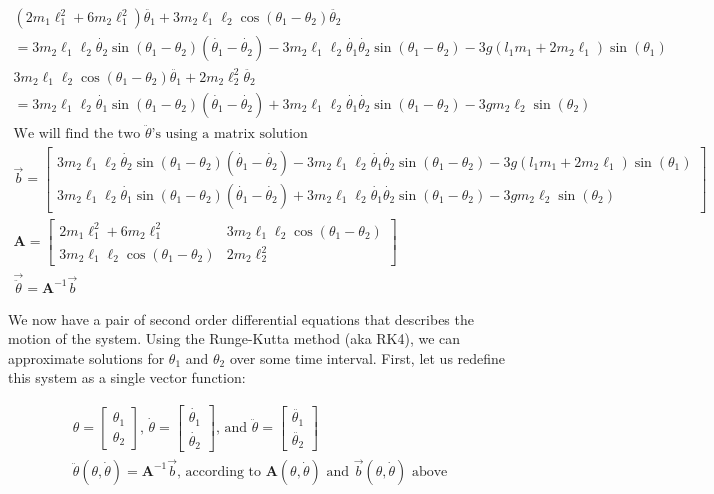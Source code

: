 \documentclass[]{article}
\begin{document}
\begin{gather*}
	(2m_1\ell_1^2 + 6m_2\ell_1^2)\ddot{\theta_1} + 3m_2\ell_1\ell_2\cos(\theta_1 - \theta_2)\ddot{\theta_2} \\
	= 3 m_2\ell_1\ell_2\dot{\theta_2}\sin(\theta_1 - \theta_2)(\dot{\theta_1} - \dot{\theta_2}) - 3m_2\ell_1\ell_2\dot{\theta_1}\dot{\theta_2}\sin(\theta_1 - \theta_2) - 3g(l_1m_1 + 2m_2\ell_1)\sin(\theta_1) \\
	3m_2\ell_1\ell_2\cos(\theta_1 - \theta_2)\ddot{\theta_1} + 2m_2\ell_2^2\ddot{\theta_2} \\ 
	= 3m_2\ell_1\ell_2\dot{\theta_1}\sin(\theta_1 - \theta_2)(\dot{\theta_1} - \dot{\theta_2}) + 3m_2\ell_1\ell_2\dot{\theta_1}\dot{\theta_2}\sin(\theta_1 - \theta_2) - 3g m_2\ell_2\sin(\theta_2) \\
	\text{We will find the two $\ddot{\theta}$'s using a matrix solution} \\
	\vec{b} = \begin{bmatrix}
		3 m_2\ell_1\ell_2\dot{\theta_2}\sin(\theta_1 - \theta_2)(\dot{\theta_1} - \dot{\theta_2}) - 3m_2\ell_1\ell_2\dot{\theta_1}\dot{\theta_2}\sin(\theta_1 - \theta_2) - 3g(l_1m_1 + 2m_2\ell_1)\sin(\theta_1) \\
		3m_2\ell_1\ell_2\dot{\theta_1}\sin(\theta_1 - \theta_2)(\dot{\theta_1} - \dot{\theta_2}) + 3m_2\ell_1\ell_2\dot{\theta_1}\dot{\theta_2}\sin(\theta_1 - \theta_2) - 3g m_2\ell_2\sin(\theta_2)
	\end{bmatrix} \\
	\boldsymbol{A} = \begin{bmatrix}
		2m_1\ell_1^2 + 6m_2\ell_1^2 & 3m_2\ell_1\ell_2\cos(\theta_1 - \theta_2) \\
		3m_2\ell_1\ell_2\cos(\theta_1 - \theta_2) & 2m_2\ell_2^2
	\end{bmatrix} \\
	\vec{\ddot{\theta}} = \boldsymbol{A}^{-1}\vec{b}
\end{gather*}

We now have a pair of second order differential equations that describes the motion of the system. Using the Runge-Kutta method (aka RK4), we can approximate solutions for $\theta_1$ and $\theta_2$ over some time interval. First, let us redefine this system as a single vector function:

\begin{gather*}
	\theta = 
	\begin{bmatrix}
		\theta_1 \\
		\theta_2
	\end{bmatrix} \text{, }
	\dot{\theta} = 
	\begin{bmatrix}
		\dot{\theta_1} \\
		\dot{\theta_2}
	\end{bmatrix} \text{, and }
	\ddot{\theta} =
	\begin{bmatrix}
		\ddot{\theta_1} \\
		\ddot{\theta_2}
	\end{bmatrix} \\
	\ddot{\theta}(\theta, \dot{\theta}) = \boldsymbol{A}^{-1}\vec{b}\text{, according to $\boldsymbol{A}(\theta, \dot{\theta})$ and $\vec{b}(\theta, \dot{\theta})$ above}
\end{gather*}
\end{document}
